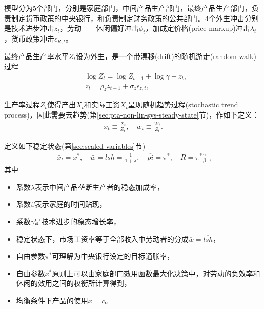 模型分为5个部门，分别是家庭部门，中间产品生产部门，最终产品生产部门，负责制定货币政策的中央银行，和负责制定财务政策的公共部门。4个外生冲击分别是技术进步冲击$z_{t}$，劳动——休闲偏好冲击$\phi_{t}$，加成定价格(price markup)冲击$\lambda_{t}$，货币政策冲击$\epsilon_{R,t}$。

最终产品生产率水平$Z_{t}$设为外生，是一个带漂移(drift)的随机游走(random walk)过程
\begin{equation}
  \label{sec:stylized-productivity-level}
  \begin{split}
      & \log Z_{t} = \log Z_{t-1} + \log \gamma + z_{t}, \\
      & z_{t} = \rho_{z} z_{t-1} + \sigma_{z} \epsilon_{z,t},
  \end{split}
\end{equation}

生产率过程$Z_{t}$使得产出$X_{t}$和实际工资$X_{t}$呈现随机趋势过程(stochastic trend process)，因此需要去趋势(第\ref{sec:pta-non-lin-sys-steady-state}节)，作如下定义：
\begin{equation}
  \label{eq:stylized-detrending-def}
  \begin{split}
    x_{t} \equiv \frac{X_{t}}{Z_{t}}, \quad w_{t} \equiv \frac{W_{t}}{Z_{t}}.
  \end{split}
\end{equation}

定义如下稳定状态(第\ref{sec:scaled-variables}节)
\begin{equation}
  \label{eq:stylized-ss-def}
  \begin{split}
    \bar{x}_{t} = x^{*}, \quad \bar{w} = \overline{lsh} = \frac{1}{1+\lambda}, \quad \overline{pi} = \pi^{*}, \quad \overline{R} = \pi^{*} \frac{\gamma}{\beta}
  \end{split},
\end{equation}
其中
\begin{itemize}
  \item 系数$\lambda$表示中间产品垄断生产者的稳态加成率，
  \item 系数$\beta$表示家庭的时间贴现，
  \item 系数$\gamma$是技术进步的稳态增长率，
  \item 稳定状态下，市场工资率等于全部收入中劳动者的分成$\overline{w}=\overline{lsh}$，
  \item 自由参数$\pi^{*}$可理解为中央银行设定的目标通胀率，
  \item 自由参数$x^{*}$原则上可以由家庭部门效用函数最大化决策中，对劳动的负效率和休闲的效用之间的权衡所计算得到，
  \item 均衡条件下产品的使用$\bar{x} = \bar{c}$。
\end{itemize}

